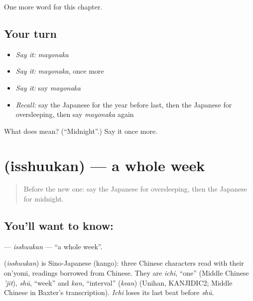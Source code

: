 \begin{grammarlens}[title={What you've built}]
One more word for this chapter.
\end{grammarlens}

\subsection*{Your turn}
\begin{itemize}
\raggedright
  \item \emph{Say it:} \emph{mayonaka}
  \item \emph{Say it:} \emph{mayonaka}, once more
  \item \emph{Say it:} say \emph{mayonaka}
  \item \emph{Recall:} say the Japanese for the year before last, then the Japanese for oversleeping, then say \emph{mayonaka} again
\end{itemize}

\begin{tcolorbox}[breakable,colback=teal!4,colframe=teal!35!black,title={Before you move on}]
What does  mean? (\textquotedblleft{}Midnight\textquotedblright{}.) Say it once more.
\end{tcolorbox}
\section[\texorpdfstring{\ja{いっしゅうかん} (isshuukan)}{いっしゅうかん (isshuukan)}]{ (isshuukan) — a whole week}

\label{lesson:JA-C76-isshuukan}



\begin{quote}
Before the new one: say the Japanese for oversleeping, then the Japanese for midnight.
\end{quote}

\subsection*{You'll want to know: }
\textbf{} — \emph{isshuukan} — \textquotedblleft{}a whole week\textquotedblright{}.

\begin{cousinweb}
\textbf{} (\emph{isshuukan}) is Sino-Japanese (kango): three Chinese characters read with their on'yomi, readings borrowed from Chinese. They are \emph{ichi}, \textquotedblleft{}one\textquotedblright{} (Middle Chinese \emph{'jit}), \emph{shū}, \textquotedblleft{}week\textquotedblright{} and \emph{kan}, \textquotedblleft{}interval\textquotedblright{} (\emph{kean}) (Unihan, KANJIDIC2; Middle Chinese in Baxter's transcription). \emph{Ichi} loses its last beat before \emph{shū}.
\end{cousinweb}

